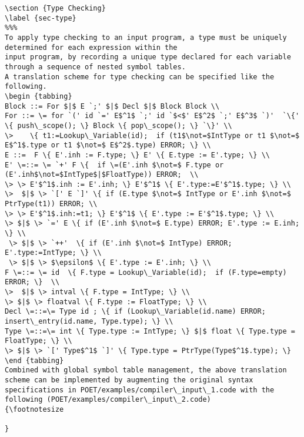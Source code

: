 \documentclass[11pt]{article}
\begin{document}
\begin {verbatim}
\section {Type Checking}
\label {sec-type}
To apply type checking to an input program, a type must be uniquely determined for each expression within the 
input program, by recording a unique type declared for each variable through a sequence of nested symbol tables.
A translation scheme for type checking can be specified like the following. 
\begin {tabbing}
Block ::= For $|$ E `;' $|$ Decl $|$ Block Block \\
For ::= \= for `(' id `=' E$^1$ `;' id `$<$' E$^2$ `;' E$^3$ `)'  `\{' \{ push\_scope(); \} Block \{ pop\_scope(); \} `\}' \\  
\>    \{ t1:=Lookup\_Variable(id);  if (t1$\not=$IntType or t1 $\not=$ E$^1$.type or t1 $\not=$ E$^2$.type) ERROR; \} \\
E ::=  F \{ E'.inh := F.type; \} E' \{ E.type := E'.type; \} \\
E' \=::= \= `+' F \{  if \=(E'.inh $\not=$ F.type or (E'.inh$\not=$IntType$|$FloatType)) ERROR;  \\
\> \> E'$^1$.inh := E'.inh; \} E'$^1$ \{ E'.type:=E'$^1$.type; \} \\
\>  $|$ \> `[' E `]' \{ if (E.type $\not=$ IntType or E'.inh $\not=$ PtrType(t1)) ERROR; \\ 
\> \> E'$^1$.inh:=t1; \} E'$^1$ \{ E'.type := E'$^1$.type; \} \\
\> $|$ \> `=' E \{ if (E'.inh $\not=$ E.type) ERROR; E'.type := E.inh; \} \\
 \> $|$ \> `++'  \{ if (E'.inh $\not=$ IntType) ERROR; E'.type:=IntType; \} \\
 \> $|$ \> $\epsilon$ \{ E'.type := E'.inh; \} \\
F \=::= \= id  \{ F.type = Lookup\_Variable(id);  if (F.type=empty) ERROR; \}  \\
\>  $|$ \> intval \{ F.type = IntType; \} \\
\> $|$ \> floatval \{ F.type := FloatType; \} \\
Decl \=::=\= Type id ; \{ if (Lookup\_Variable(id.name) ERROR;   insert\_entry(id.name, Type.type); \} \\
Type \=::=\= int \{ Type.type := IntType; \} $|$ float \{ Type.type = FloatType; \} \\
\> $|$ \> `[' Type$^1$ `]' \{ Type.type = PtrType(Type$^1$.type); \}
\end {tabbing}
Combined with global symbol table management, the above translation scheme can be implemented by augmenting the original syntax specifications in POET/examples/compiler\_input\_1.code with the following (POET/examples/compiler\_input\_2.code)
{\footnotesize

}


\end{verbatim}
\end{document}
